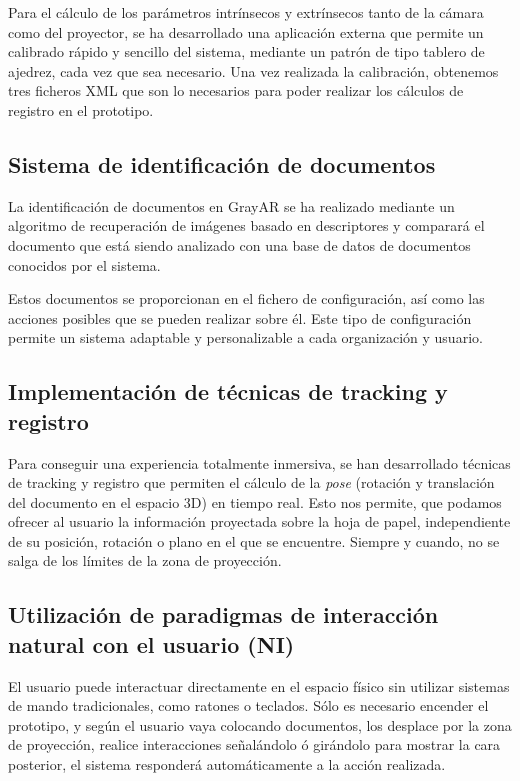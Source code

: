 Para el cálculo de los parámetros intrínsecos y extrínsecos tanto de la cámara como del proyector, se ha desarrollado una aplicación externa que permite un calibrado rápido y sencillo del sistema, mediante un patrón de tipo tablero de ajedrez, cada vez que sea necesario. Una vez realizada la calibración, obtenemos tres ficheros XML que son lo necesarios para poder realizar los cálculos de registro en el prototipo. 

\subsection{Sistema de identificación de documentos}
La identificación de documentos en GrayAR se ha realizado mediante un algoritmo de recuperación de imágenes basado en descriptores y comparará el documento que está siendo analizado con una base de datos de documentos conocidos por el sistema.

Estos documentos se proporcionan en el fichero de configuración, así como las acciones posibles que se pueden realizar sobre él. Este tipo de configuración permite un sistema adaptable y personalizable a cada organización y usuario. 

\subsection{Implementación de técnicas de tracking y registro}
Para conseguir una experiencia totalmente inmersiva, se han desarrollado técnicas de tracking y registro que permiten el cálculo de la \emph{pose} (rotación y translación del documento en el espacio 3D) en tiempo real. Esto nos permite, que podamos ofrecer al usuario la información proyectada sobre la hoja de papel, independiente de su posición, rotación o plano en el que se encuentre. Siempre y cuando, no se salga de los límites de la zona de proyección.

\subsection{Utilización de paradigmas de interacción natural con el usuario  (NI)}
El usuario puede interactuar directamente en el espacio físico sin utilizar sistemas de mando tradicionales, como ratones o teclados. Sólo es necesario encender el prototipo, y según el usuario vaya colocando documentos, los desplace por la zona de proyección, realice interacciones señalándolo ó girándolo para mostrar la cara posterior, el sistema responderá automáticamente a la acción realizada. 

